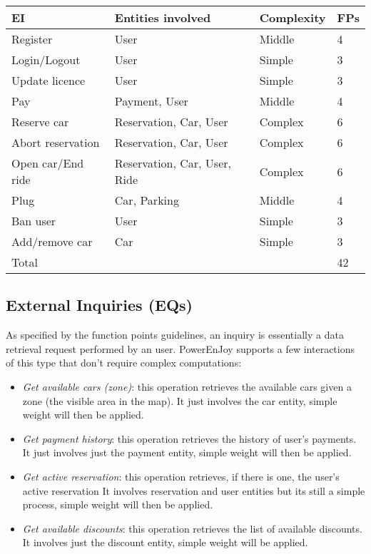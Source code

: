 \begin{table}[H]
	\centering
	\begin{tabular}{|l|l|l|l|}
		\hline
		EI & Entities involved & Complexity & FPs \\
		\hline
		Register & User & Middle & 4 \\
		Login/Logout & User & Simple & 3 \\
		Update licence & User & Simple & 3 \\
		Pay & Payment, User & Middle & 4 \\
		Reserve car & Reservation, Car, User & Complex & 6 \\
		Abort reservation & Reservation, Car, User & Complex & 6 \\
		Open car/End ride & Reservation, Car, User, Ride & Complex & 6 \\
		Plug & Car, Parking & Middle & 4 \\
		Ban user & User & Simple & 3 \\
		Add/remove car & Car & Simple & 3 \\
		\hline
		\multicolumn{3}{|l|}{Total} & 42 \\
		\hline	
	\end{tabular}
\end{table}

\subsection{External Inquiries (EQs)}
As specified by the function points guidelines, an inquiry is essentially a data retrieval
request performed by an user. PowerEnJoy supports a few interactions of this type that don’t require
complex computations:
\begin{itemize}
	\item \emph{Get available cars (zone)}: this operation retrieves the available cars given a zone (the visible area in the map). It just involves the car entity, simple weight will then be applied.
	\item \emph{Get payment history}: this operation retrieves the history of user's payments. It just involves just the payment entity, simple weight will then be applied.
	\item \emph{Get active reservation}: this operation retrieves, if there is one, the user's active reservation It involves reservation and user entities but its still a simple process, simple weight will then be applied.
	\item \emph{Get available discounts}: this operation retrieves the list of available discounts. It involves just the discount entity, simple weight will be applied.
\end{itemize}


